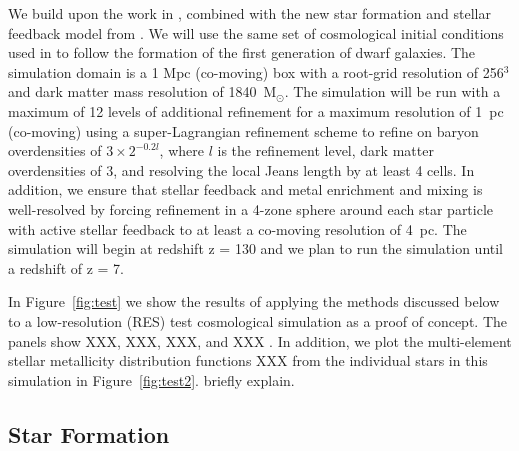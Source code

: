 \documentclass[12pt]{article} %
\begin{document}
We build upon the work in \citep{Wise2012a,WiseAbel2012,Wise2014,Corlies2018}, combined with the new star formation and stellar feedback model from \citep{Emerick2019a}. We will use the same set of cosmological initial conditions used in \citep{Wise2012a} to follow the formation of the first generation of dwarf galaxies. The simulation domain is a 1 Mpc (co-moving) box with a root-grid resolution of 256$^3$ and dark matter mass resolution of 1840~M$_{\odot}$. The simulation will be run with a maximum of 12 levels of additional refinement for a maximum resolution of 1~pc (co-moving) using a super-Lagrangian refinement scheme \citep{OsheaNorma2008} to refine on baryon overdensities of $3\times 2^{-0.2l}$, where $l$ is the refinement level, dark matter overdensities of 3, and resolving the local Jeans length by at least 4 cells. In addition, we ensure that stellar feedback and metal enrichment and mixing is well-resolved by forcing refinement in a 4-zone sphere around each star particle with active stellar feedback to at least a co-moving resolution of 4~pc. The simulation will begin at redshift z = 130 and we plan to run the simulation until a redshift of z = 7. 

In Figure~\ref{fig:test} we show the results of applying the methods discussed below to a low-resolution (RES) test cosmological simulation as a proof of concept. The panels show XXX, XXX, XXX, and XXX . In addition, we plot the multi-element stellar metallicity distribution functions XXX from the individual stars in this simulation in Figure~\ref{fig:test2}. briefly explain.

\subsection{Star Formation}
\end{document}
